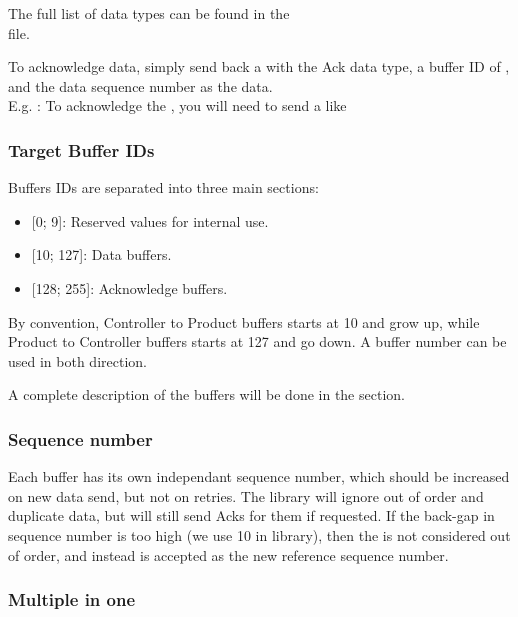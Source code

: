 The full list of data types can be found in the\\
 file.


To acknowledge data, simply send back a  with the Ack data type, a buffer ID of , and the data sequence number as the data.\\
E.g. : To acknowledge the  , you will need to send a  like 

\subsubsection{Target Buffer IDs}

Buffers IDs are separated into three main sections:
\begin{itemize}
\item{[0; 9]: Reserved values for  internal use.}
\item{[10; 127]: Data buffers.}
\item{[128; 255]: Acknowledge buffers.}
\end{itemize}

By convention, Controller to Product buffers starts at 10 and grow up, while Product to Controller buffers starts at 127 and go down. A buffer number can be used in both direction.


A complete description of the buffers will be done in the  section.

\subsubsection{Sequence number}

Each buffer has its own independant sequence number, which should be increased on new data send, but not on retries. The  library will ignore out of order and duplicate data, but will still send Acks for them if requested. If the back-gap in sequence number is too high (we use 10 in  library), then the  is not considered out of order, and instead is accepted as the new reference sequence number.

\subsubsection{Multiple  in one }

